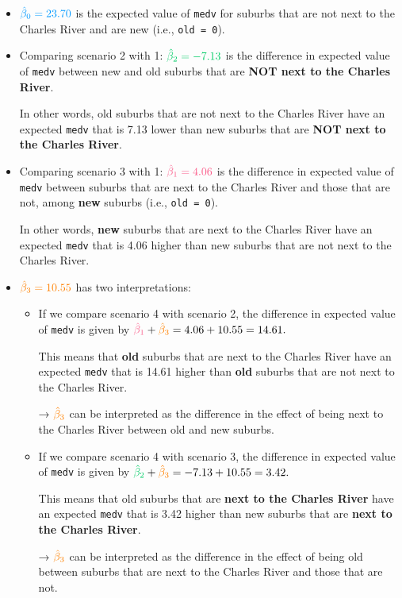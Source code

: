 \documentclass[
  12pt,
  letterpaper,
]{scrbook}
\theoremstyle{definition}
\theoremstyle{plain}
\theoremstyle{remark}
\begin{document}
\begin{itemize}
\item
  \(\color[HTML]{0099FF}{\hat{\beta}_0} = 23.70\) is the expected value
  of \texttt{medv} for suburbs that are not next to the Charles River
  and are new (i.e., \texttt{old\ =\ 0}).
\item
  Comparing scenario 2 with 1:
  \(\color[HTML]{00CC66}{\hat{\beta}_2} = -7.13\) is the difference in
  expected value of \texttt{medv} between new and old suburbs that are
  \textbf{NOT next to the Charles River}.

  In other words, old suburbs that are not next to the Charles River
  have an expected \texttt{medv} that is 7.13 lower than new suburbs
  that are \textbf{NOT next to the Charles River}.
\item
  Comparing scenario 3 with 1:
  \(\color[HTML]{fb5b89}{\hat{\beta}_1} = 4.06\) is the difference in
  expected value of \texttt{medv} between suburbs that are next to the
  Charles River and those that are not, among \textbf{new} suburbs
  (i.e., \texttt{old\ =\ 0}).

  In other words, \textbf{new} suburbs that are next to the Charles
  River have an expected \texttt{medv} that is 4.06 higher than new
  suburbs that are not next to the Charles River.
\item
  \(\color{orange}{\hat{\beta}_3} = 10.55\) has two interpretations:

  \begin{itemize}
  \item
    If we compare scenario 4 with scenario 2, the difference in expected
    value of \texttt{medv} is given by
    \({\color[HTML]{fb5b89}\hat{\beta}_1} + {\color{orange}\hat{\beta}_3} = 4.06 + 10.55 = 14.61.\)

    This means that \textbf{old} suburbs that are next to the Charles
    River have an expected \texttt{medv} that is 14.61 higher than
    \textbf{old} suburbs that are not next to the Charles River.

    → \(\color{orange}{\hat{\beta}_3}\) can be interpreted as the
    difference in the effect of being next to the Charles River between
    old and new suburbs.
  \item
    If we compare scenario 4 with scenario 3, the difference in expected
    value of \texttt{medv} is given by
    \({\color[HTML]{00CC66}\hat{\beta}_2} + {\color{orange}\hat{\beta}_3} = -7.13 + 10.55 = 3.42.\)

    This means that old suburbs that are \textbf{next to the Charles
    River} have an expected \texttt{medv} that is 3.42 higher than new
    suburbs that are \textbf{next to the Charles River}.

    → \(\color{orange}{\hat{\beta}_3}\) can be interpreted as the
    difference in the effect of being old between suburbs that are next
    to the Charles River and those that are not.
  \end{itemize}
\end{itemize}
\end{document}
